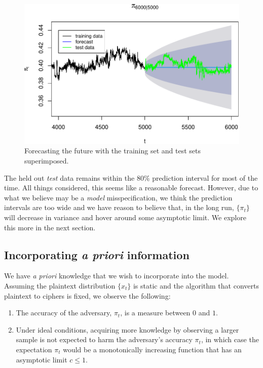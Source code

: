 \documentclass[final,
  11pt,
]{article}
\begin{document}
\begin{figure}
\includegraphics{paper_files/figure-latex/unnamed-chunk-16-1.pdf}
\caption{Forecasting the future with the training set and test sets superimposed.}
\label{fig:forecast}
\end{figure}

The held out \emph{test} data remains within the \(80\%\) prediction
interval for most of the time. All things considered, this seems like a
reasonable forecast. However, due to what we believe may be a
\emph{model} misspecification, we think the prediction intervals are too
wide and we have reason to believe that, in the long run, \(\{\pi_t\}\)
will decrease in variance and hover around some asymptotic limit. We
explore this more in the next section.

\hypertarget{incorporating-information}{%
\subsection{\texorpdfstring{Incorporating \emph{a priori}
information}{Incorporating  information}}\label{incorporating-information}}

We have \emph{a priori} knowledge that we wish to incorporate into the
model. Assuming the plaintext distribution \(\{x_t\}\) is static and the
algorithm that converts plaintext to ciphers is fixed, we observe the
following:

\begin{enumerate}
\item The accuracy of the adversary, $\pi_t$, is a measure between $0$ and $1$.
\item Under ideal conditions, acquiring more knowledge by observing a larger
sample is not expected to harm the adversary's accuracy $\pi_t$, in which case
the expectation $\pi_t$ would be a monotonically increasing function that has
an asymptotic limit $c \leq 1$.
\end{enumerate}
\end{document}
